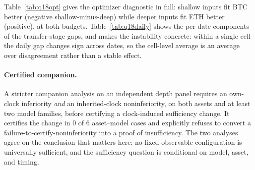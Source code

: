 

Table~\ref{tab:q18opt} gives the optimizer diagnostic in full: shallow inputs fit BTC better
(negative shallow-minus-deep) while deeper inputs fit ETH better (positive), at both budgets.
Table~\ref{tab:q18daily} shows the per-date components of the transfer-stage gaps, and makes
the instability concrete: within a single cell the daily gap changes sign across dates, so the
cell-level average is an average over disagreement rather than a stable effect.



\paragraph{Certified companion.} A stricter companion analysis on an independent depth panel
requires an own-clock inferiority \emph{and} an inherited-clock noninferiority, on both assets
and at least two model families, before certifying a clock-induced sufficiency change. It
certifies the change in $0$ of $6$ asset--model cases and explicitly refuses to convert a
failure-to-certify-noninferiority into a proof of insufficiency. The two analyses agree on the
conclusion that matters here: no fixed observable configuration is universally sufficient, and
the sufficiency question is conditional on model, asset, and timing.
